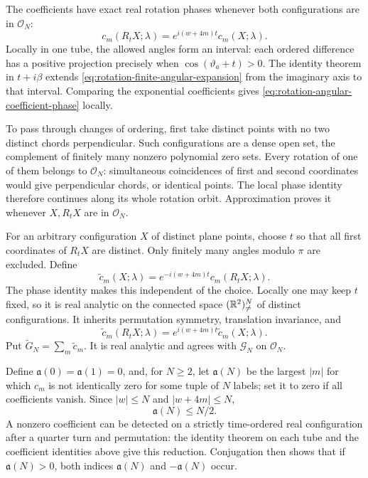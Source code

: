 The coefficients have exact real rotation phases whenever both
configurations are in $\mathcal O_N$:
\begin{equation}\label{eq:rotation-angular-coefficient-phase}
 c_m(R_tX;\lambda)=e^{i(w+4m)t}c_m(X;\lambda).
\end{equation}
Locally in one tube, the allowed angles form an interval:
each ordered difference has a positive projection precisely
when $\cos(\vartheta_a+t)>0$.
The identity theorem in $t+i\beta$ extends
\eqref{eq:rotation-finite-angular-expansion} from the imaginary
axis to that interval. Comparing the exponential coefficients
gives \eqref{eq:rotation-angular-coefficient-phase} locally.

To pass through changes of ordering, first take distinct points
with no two distinct chords perpendicular. Such configurations
are a dense open set, the complement of finitely many nonzero
polynomial zero sets. Every rotation of one of them belongs to
$\mathcal O_N$: simultaneous coincidences of first and second
coordinates would give perpendicular chords, or identical points.
The local phase identity therefore continues along its whole
rotation orbit. Approximation proves it whenever $X,R_tX$
are in $\mathcal O_N$.

For an arbitrary configuration $X$ of distinct plane points,
choose $t$ so that all first coordinates of $R_tX$ are distinct.
Only finitely many angles modulo $\pi$ are excluded.
Define
\[
 \widetilde c_m(X;\lambda)
       =e^{-i(w+4m)t}c_m(R_tX;\lambda).
\]
The phase identity makes this independent of the choice.
Locally one may keep $t$ fixed, so it is real analytic on the
connected space $(\mathbb R^2)^N_{\ne}$ of distinct configurations.
It inherits permutation symmetry, translation invariance, and
\[
 \widetilde c_m(R_tX;\lambda)
       =e^{i(w+4m)t}\widetilde c_m(X;\lambda).
\]
Put $\widetilde G_N=\sum_m\widetilde c_m$.
It is real analytic and agrees with $\mathcal G_N$ on $\mathcal O_N$.

Define $\mathfrak a(0)=\mathfrak a(1)=0$, and, for $N\ge2$,
let $\mathfrak a(N)$ be the largest $|m|$ for which $c_m$ is
not identically zero for some tuple of $N$ labels; set it to zero
if all coefficients vanish. Since $|w|\le N$ and $|w+4m|\le N$,
\begin{equation}\label{eq:rotation-angular-linear-bound}
 \mathfrak a(N)\le N/2.
\end{equation}
A nonzero coefficient can be detected on a strictly time-ordered
real configuration after a quarter turn and permutation:
the identity theorem on each tube and the coefficient identities
above give this reduction. Conjugation then shows that if
$\mathfrak a(N)>0$, both indices
$\mathfrak a(N)$ and $-\mathfrak a(N)$ occur.

